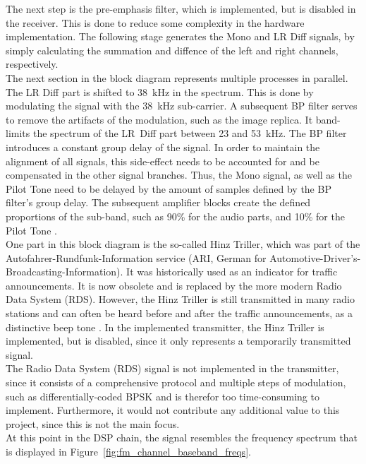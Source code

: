 The next step is the pre-emphasis filter, which is implemented, but is disabled in the receiver.
This is done to reduce some complexity in the hardware implementation.
The following stage generates the Mono and LR Diff signals, by simply calculating the summation and diffence of the left and right channels, respectively.\\

The next section in the block diagram represents multiple processes in parallel.
The LR Diff part is shifted to 38~kHz in the spectrum.
This is done by modulating the signal with the 38~kHz sub-carrier.
A subsequent BP filter serves to remove the artifacts of the modulation, such as the image replica.
It band-limits the spectrum of the LR~Diff part between 23 and 53~kHz.
The BP filter introduces a constant group delay of the signal.
In order to maintain the alignment of all signals, this side-effect needs to be accounted for and be compensated in the other signal branches.
Thus, the Mono signal, as well as the Pilot Tone need to be delayed by the amount of samples defined by the BP filter's group delay.
The subsequent amplifier blocks create the defined proportions of the sub-band, such as 90\% for the audio parts, and 10\% for the Pilot Tone \cite{FmMultiplexingForStereo}.\\

One part in this block diagram is the so-called Hinz Triller, which was part of the Autofahrer-Rundfunk-Information service (ARI, German for Automotive-Driver's-Broadcasting-Information).
It was historically used as an indicator for traffic announcements.
It is now obsolete and is replaced by the more modern Radio Data System (RDS).
However, the Hinz Triller is still transmitted in many radio stations and can often be heard before and after the traffic announcements, as a distinctive beep tone \cite{HinzTriller}.
In the implemented transmitter, the Hinz Triller is implemented, but is disabled, since it only represents a temporarily transmitted signal.\\

The Radio Data System (RDS) signal is not implemented in the transmitter, since it consists of a comprehensive protocol and multiple steps of modulation, such as differentially-coded BPSK \cite{IntroFmStereoRdsModulation} and is therefor too time-consuming to implement.
Furthermore, it would not contribute any additional value to this project, since this is not the main focus.\\

At this point in the DSP chain, the signal resembles the frequency spectrum that is displayed in Figure~\ref{fig:fm_channel_baseband_freqs}.\\

